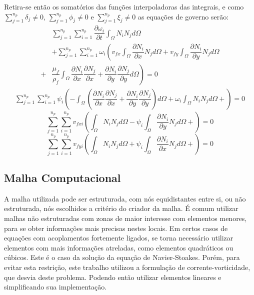Retira-se então os somatórios das funções interpoladoras das integrais, e como $\sum_{j=1}^{n_p} \delta_j \neq 0$, $\sum_{j=1}^{n_p} \phi_j \neq 0$ e $\sum_{j=1}^{n_p} \xi_j \neq 0$ as equações de governo serão:
\begin{align}
    &\sum_{j=1}^{n_p}
    \sum_{i=1}^{n_p} \dfrac{\partial \omega_i}{\partial t}
    \int_{\Omega}
    N_i N_j
    d\Omega \nonumber\\&+
    \sum_{j=1}^{n_p}
    \sum_{i=1}^{n_p}
    \omega_i
    \left(
        v_{fx}
        \int_{\Omega}
        \dfrac{\partial N_i}{\partial x}
        N_j
        d\Omega +
        v_{fy}
        \int_{\Omega}
        \dfrac{\partial N_i}{\partial y}
        N_j
        d\Omega \right.\nonumber\\ +& \left.
        \dfrac{\mu_f}{\rho_f}
        \int_{\Omega}
        \dfrac{\partial N_i}{\partial x}
        \dfrac{\partial N_j}{\partial x} +
        \dfrac{\partial N_i}{\partial y}
        \dfrac{\partial N_j}{\partial y}
        d\Omega
    \right) = 0
\end{align}
\begin{align}
    \sum_{j=1}^{n_p}
    \sum_{i=1}^{n_p}
    \psi_i
    \left(
        -\int_{\Omega} \left(
        \dfrac{\partial N_i}{\partial x}
        \dfrac{\partial N_j}{\partial x} +
        \dfrac{\partial N_i}{\partial y}
        \dfrac{\partial N_j}{\partial y}
        \right) d\Omega +
        \omega_i
        \int_{\Omega}
        N_i
        N_j
        d\Omega +
    \right) = 0
\end{align}
\begin{equation}
    \sum_{j=1}^{n_p}
    \sum_{i=1}^{n_p}
    v_{fxi}
    \left(
        \int_{\Omega}
        N_i
        N_j
        d\Omega -
        \psi_i
        \int_{\Omega}
        \dfrac{\partial N_i}{\partial y}
        N_j
        d\Omega +
    \right) = 0
\end{equation}
\begin{equation}
    \sum_{j=1}^{n_p}
    \sum_{i=1}^{n_p}
    v_{fyi}
    \left(
        \int_{\Omega}
        N_i
        N_j
        d\Omega +
        \psi_i
        \int_{\Omega}
        \dfrac{\partial N_i}{\partial x}
        N_j
        d\Omega +
    \right) = 0
\end{equation}

\subsection{\textbf{Malha Computacional}}
A malha utilizada pode ser estruturada, com nós equidistantes entre si, ou não estruturada, nós escolhidos a critério do criador da malha.
É comum utilizar malhas não estruturadas com zonas de maior interesse com elementos menores, para se obter informações mais precisas nestes locais.
Em certos casos de equações com acoplamentos fortemente ligados, se torna necessário utilizar elementos com mais informações atreladas, como elementos quadráticos ou cúbicos.
Este é o caso da solução da equação de Navier-Stoakes.
Porém, para evitar esta restrição, este trabalho utilizou a formulação de corrente-vorticidade, que desvia deste problema.
Podendo então utilizar elementos lineares e simplificando sua implementação.

